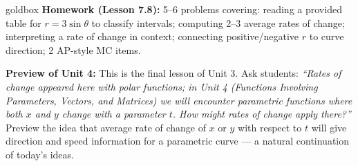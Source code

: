 \documentclass[10pt]{article}
\begin{document}
\vspace{0.08in}

\begin{skillbox}{goldbox}
\textbf{Homework (Lesson 7.8):} 5--6 problems covering: reading a provided table
for $r = 3\sin\theta$ to classify intervals; computing 2--3 average rates of change;
interpreting a rate of change in context; connecting positive/negative $r$ to curve
direction; 2 AP-style MC items.

\textbf{Preview of Unit 4:} This is the final lesson of Unit 3.
Ask students: \textit{``Rates of change appeared here with polar functions; in
Unit 4 (Functions Involving Parameters, Vectors, and Matrices) we will encounter
parametric functions where both $x$ and $y$ change with a parameter $t$. How might
rates of change apply there?''} Preview the idea that average rate of change of
$x$ or $y$ with respect to $t$ will give direction and speed information for a
parametric curve --- a natural continuation of today's ideas.
\end{skillbox}
\end{document}
